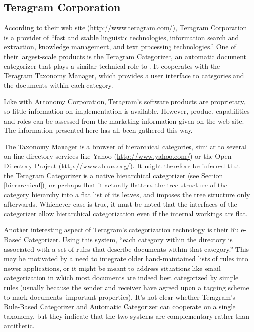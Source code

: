\subsection{Teragram Corporation}

According to their web site (\url{http://www.teragram.com/}), Teragram
Corporation is a provider of ``fast and stable linguistic
technologies, information search and extraction, knowledge management,
and text processing technologies.''  One of their largest-scale
products is the Teragram Categorizer, an automatic document
categorizer that plays a similar technical role to \aicat.
It cooperates with the Teragram Taxonomy Manager, which provides a
user interface to categories and the documents within each category.

Like with Autonomy Corporation, Teragram's software products are proprietary, so little
information on implementation is available.  However, product
capabilities and roles can be assessed from the marketing information
given on the web site.  The information presented here has all been
gathered this way.

The Taxonomy Manager is a browser of hierarchical categories, similar
to several on-line directory services like Yahoo
(\url{http://www.yahoo.com/}) or the Open Directory Project
(\url{http://www.dmoz.org/}).  It might therefore be inferred that the
Teragram Categorizer is a native hierarchical categorizer (see Section
\ref{hierarchical}), or perhaps that it
actually flattens the tree structure of the category
hierarchy into a flat list of its leaves, and imposes the tree
structure only afterwards.  Whichever case is true, it must be noted
that the interfaces of the categorizer allow hierarchical
categorization even if the internal workings are flat.

Another interesting aspect of Teragram's categorization technology is
their Rule-Based Categorizer.  Using this system, ``each category
within the directory is associated with a set of rules that describe
documents within that category.''  This may be motivated by a need to
integrate older hand-maintained lists of rules into newer
applications, or it might be meant to address situations like email
categorization in which most documents are indeed best categorized by
simple rules (usually because the sender and receiver have agreed upon
a tagging scheme to mark documents' important properties).  It's not
clear whether Teragram's Rule-Based Categorizer and Automatic
Categorizer can cooperate on a single taxonomy, but they indicate that
the two systems are complementary rather than antithetic.

